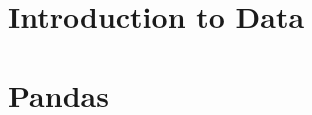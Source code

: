 % 

% 

 


% 
% 
% 

 



 

 
 
 
 \section[DataIntro]{Introduction to Data}
 
 

 \section[Pandas]{Pandas}
 

